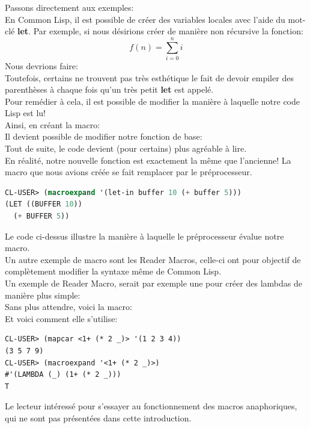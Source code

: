 \documentclass[a4paper, 12pt]{article}
\numberwithin{equation}{subsection}
\begin{document}
Passons directement aux exemples:\\

En Common Lisp, il est possible de créer des variables locales avec l'aide du mot-clé {\bf let}. Par exemple, si nous désirions créer de manière non récursive la fonction: \\

$$f(n) = \sum_{i=0}^{n}i$$
Nous devrions faire: \\

Toutefois, certains ne trouvent pas très esthétique le fait de devoir empiler des parenthèses à chaque fois qu'un très petit {\bf let} est appelé. \\

Pour remédier à cela, il est possible de modifier la manière à laquelle notre code Lisp est lu! \\

Ainsi, en créant la macro: \\

Il devient possible de modifier notre fonction de base: \\

Tout de suite, le code devient (pour certains) plus agréable à lire.\\

En réalité, notre nouvelle fonction est exactement la même que l'ancienne! La macro que nous avions créée se fait remplacer par le préprocesseur.
\begin{lstlisting}[language=Lisp]
CL-USER> (macroexpand '(let-in buffer 10 (+ buffer 5)))
(LET ((BUFFER 10))
  (+ BUFFER 5))
\end{lstlisting}
Le code ci-dessus illustre la manière à laquelle le préprocesseur évalue notre macro.\\

Un autre exemple de macro sont les Reader Macros, celle-ci ont pour objectif de complètement modifier la syntaxe même de Common Lisp. \\

Un exemple de Reader Macro, serait par exemple une pour créer des lambdas de manière plus simple:\\

Sans plus attendre, voici la macro: \\

Et voici comment elle s'utilise: \\
\begin{lstlisting}
CL-USER> (mapcar <1+ (* 2 _)> '(1 2 3 4))
(3 5 7 9)
CL-USER> (macroexpand '<1+ (* 2 _)>)
#'(LAMBDA (_) (1+ (* 2 _)))
T
\end{lstlisting}
Le lecteur intéressé pour s'essayer au fonctionnement des macros anaphoriques, qui ne sont pas présentées dans cette introduction.\\
\end{document}
